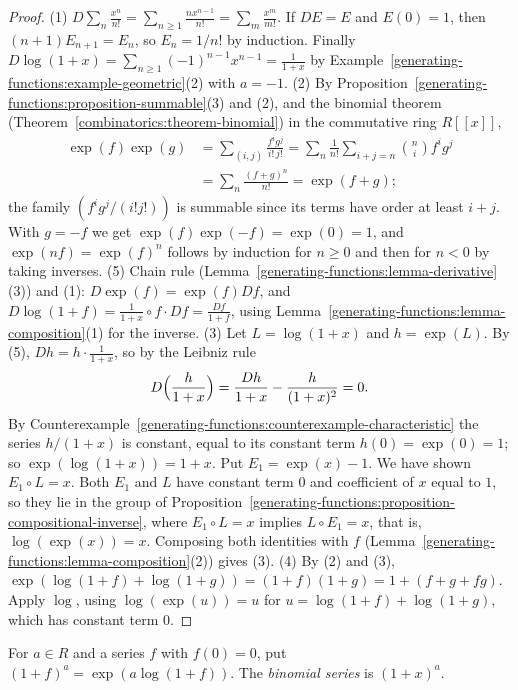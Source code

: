 \begin{proof}
(1) $D\sum_n\frac{x^n}{n!} = \sum_{n \geq 1}\frac{nx^{n-1}}{n!} = \sum_m\frac{x^m}{m!}$. If $DE = E$ and $E(0) = 1$, then $(n + 1)E_{n+1} = E_n$, so $E_n = 1/n!$ by induction. Finally
$D\log(1 + x) = \sum_{n \geq 1}(-1)^{n-1}x^{n-1} = \frac{1}{1 + x}$ by Example~\ref{generating-functions:example-geometric}(2) with $a = -1$.
(2) By Proposition~\ref{generating-functions:proposition-summable}(3) and (2), and the binomial theorem (Theorem~\ref{combinatorics:theorem-binomial}) in the commutative ring $R[[x]]$,
\[
\begin{aligned}
\exp(f)\exp(g) &= \sum_{(i,j)}\frac{f^ig^j}{i!\,j!} = \sum_n\frac{1}{n!}\sum_{i+j=n}\binom{n}{i}f^ig^j\\
&= \sum_n\frac{(f + g)^n}{n!} = \exp(f + g);
\end{aligned}
\]
the family $(f^ig^j/(i!j!))$ is summable since its terms have order at least $i + j$. With $g = -f$ we get $\exp(f)\exp(-f) = \exp(0) = 1$, and $\exp(nf) = \exp(f)^n$ follows by induction for
$n \geq 0$ and then for $n < 0$ by taking inverses.
(5) Chain rule (Lemma~\ref{generating-functions:lemma-derivative}(3)) and (1): $D\exp(f) = \exp(f)Df$, and $D\log(1 + f) = \frac{1}{1 + x} \circ f \cdot Df = \frac{Df}{1 + f}$, using
Lemma~\ref{generating-functions:lemma-composition}(1) for the inverse.
(3) Let $L = \log(1 + x)$ and $h = \exp(L)$. By (5), $Dh = h \cdot \frac{1}{1 + x}$, so by the Leibniz rule
\[
D\Bigl(\frac{h}{1 + x}\Bigr) = \frac{Dh}{1 + x} - \frac{h}{(1 + x)^2} = 0.
\]
By Counterexample~\ref{generating-functions:counterexample-characteristic} the series $h/(1 + x)$ is constant, equal to its constant term $h(0) = \exp(0) = 1$; so $\exp(\log(1 + x)) = 1 + x$. Put
$E_1 = \exp(x) - 1$. We have shown $E_1 \circ L = x$. Both $E_1$ and $L$ have constant term $0$ and coefficient of $x$ equal to $1$, so they lie in the group of
Proposition~\ref{generating-functions:proposition-compositional-inverse}, where $E_1 \circ L = x$ implies $L \circ E_1 = x$, that is, $\log(\exp(x)) = x$. Composing both identities with $f$
(Lemma~\ref{generating-functions:lemma-composition}(2)) gives (3).
(4) By (2) and (3), $\exp(\log(1 + f) + \log(1 + g)) = (1 + f)(1 + g) = 1 + (f + g + fg)$. Apply $\log$, using $\log(\exp(u)) = u$ for $u = \log(1 + f) + \log(1 + g)$, which has constant term $0$.
\end{proof}

\begin{definition}\label{generating-functions:definition-powers}
For $a \in R$ and a series $f$ with $f(0) = 0$, put $(1 + f)^a = \exp(a\log(1 + f))$. The \emph{binomial series} is $(1 + x)^a$.
\end{definition}


